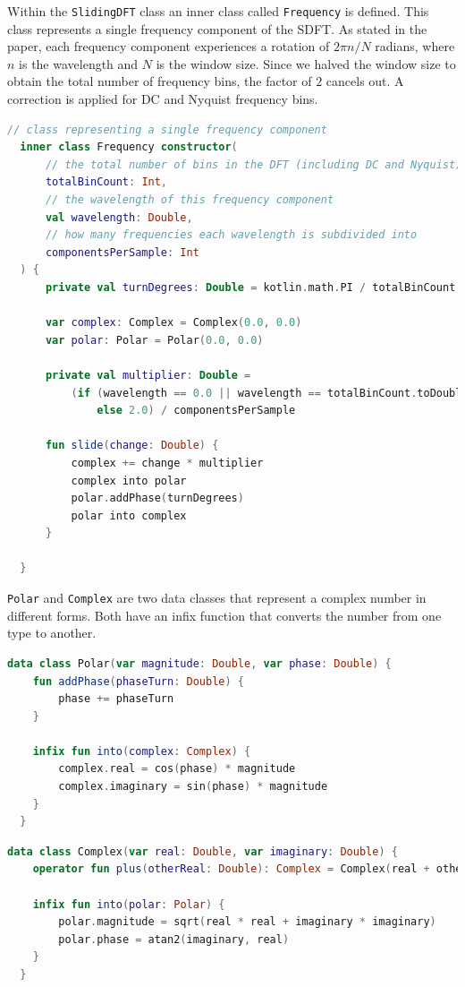 \documentclass[11pt,twoside,a4paper]{report}
\begin{document}
Within the \texttt{SlidingDFT} class an inner class called \texttt{Frequency} is defined. This class represents a single frequency component of the SDFT. As stated in the paper, each frequency component experiences a rotation of $2\pi n / N$ radians, where $n$ is the wavelength and $N$ is the window size. Since we halved the window size to obtain the total number of frequency bins, the factor of $2$ cancels out. A correction is applied for DC and Nyquist frequency bins.


\begin{lstlisting}[caption={SlidingDFT.Frequency}, label={lst:sdftFrequency}, language=Kotlin]
  // class representing a single frequency component
  inner class Frequency constructor(
      // the total number of bins in the DFT (including DC and Nyquist)
      totalBinCount: Int,
      // the wavelength of this frequency component
      val wavelength: Double, 
      // how many frequencies each wavelength is subdivided into
      componentsPerSample: Int 
  ) {
      private val turnDegrees: Double = kotlin.math.PI / totalBinCount * wavelength

      var complex: Complex = Complex(0.0, 0.0)
      var polar: Polar = Polar(0.0, 0.0)

      private val multiplier: Double =
          (if (wavelength == 0.0 || wavelength == totalBinCount.toDouble()) 1.0 
              else 2.0) / componentsPerSample

      fun slide(change: Double) {
          complex += change * multiplier
          complex into polar
          polar.addPhase(turnDegrees)
          polar into complex
      }

  }
\end{lstlisting}

\texttt{Polar} and \texttt{Complex} are two data classes that represent a complex number in different forms. Both have an infix function that converts the number from one type to another.


\begin{lstlisting}[caption={Polar.kt}, label={lst:polar}, language=Kotlin]
  data class Polar(var magnitude: Double, var phase: Double) {
    fun addPhase(phaseTurn: Double) {
        phase += phaseTurn
    }

    infix fun into(complex: Complex) {
        complex.real = cos(phase) * magnitude
        complex.imaginary = sin(phase) * magnitude
    }
  }
\end{lstlisting}

\begin{lstlisting}[caption={Complex.kt}, label={lst:complex}, language=Kotlin]
  data class Complex(var real: Double, var imaginary: Double) {
    operator fun plus(otherReal: Double): Complex = Complex(real + otherReal, imaginary)

    infix fun into(polar: Polar) {
        polar.magnitude = sqrt(real * real + imaginary * imaginary)
        polar.phase = atan2(imaginary, real)
    }
  }
\end{lstlisting}
\end{document}
